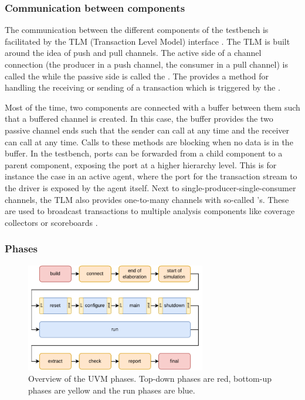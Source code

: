 \subsubsection{Communication between components} %

The communication between the different components of the testbench is facilitated by the TLM (Transaction Level
Model) interface \cite{UVM12}. The TLM is built around the idea of push and pull channels. The active side of a channel connection
(the producer in a push channel, the consumer in a pull channel) is called the  while the passive side is
called the . The  provides a method for handling the receiving or sending of a transaction
which is triggered by the  \cite[ch. 4.5]{mehta2018asic}.

Most of the time, two components are connected with a buffer between them such
that a buffered channel is created. In this case, the buffer provides the two passive channel ends such that the
sender can call  at any time and the receiver can call  at any time. Calls to these methods are
blocking when no data is in the buffer. In the testbench, ports can be forwarded from a child component to a parent
component, exposing the port at a higher hierarchy level. This is for instance the case in an active agent, where the
port for the transaction stream to the driver is exposed by the agent itself. Next to single-producer-single-consumer
channels, the TLM also provides one-to-many channels with so-called 's. These are used to
broadcast transactions to multiple analysis components like coverage collectors or scoreboards \cite[ch. 4.5]{mehta2018asic}.

\subsubsection{Phases} %

\begin{figure}
  \centering
  \includegraphics[width=0.7\textwidth]{diagrams/phases.pdf}
  \caption{Overview of the UVM phases. Top-down phases are red, bottom-up phases are yellow and the run phases are blue.}
  \label{fig:uvm_phases}
\end{figure}

